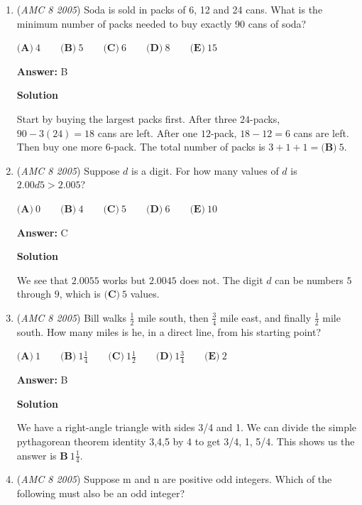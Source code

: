 \begin{enumerate}
	\item (\textit{AMC 8 2005}) Soda is sold in packs of 6, 12 and 24 cans. What is the minimum number of packs needed to buy exactly 90 cans of soda?


 $\textbf{(A)}\ 4\qquad\textbf{(B)}\ 5\qquad\textbf{(C)}\ 6\qquad\textbf{(D)}\ 8\qquad\textbf{(E)}\ 15$

 \textbf{Answer: }B



\textbf{Solution}

Start by buying the largest packs first. After three $24$-packs, $90-3(24)=18$ cans are left. After one $12$-pack, $18-12=6$ cans are left. Then buy one more $6$-pack. The total number of packs is $3+1+1=\boxed{\textbf{(B)}\ 5}$.

 


	\item (\textit{AMC 8 2005}) Suppose $d$ is a digit. For how many values of $d$ is $2.00d5 > 2.005$?


 $\textbf{(A)}\ 0\qquad\textbf{(B)}\ 4\qquad\textbf{(C)}\ 5\qquad\textbf{(D)}\ 6\qquad\textbf{(E)}\ 10$

 \textbf{Answer: }C



\textbf{Solution}

We see that $2.0055$ works but $2.0045$ does not. The digit $d$ can be numbers $5$ through $9$, which is $\boxed{\textbf{(C)}\ 5}$ values.

 


	\item (\textit{AMC 8 2005}) Bill walks $\frac12$ mile south, then $\frac34$ mile east, and finally $\frac12$ mile south. How many miles is he, in a direct line, from his starting point?


 $\textbf{(A)}\ 1\qquad\textbf{(B)}\ 1\frac14\qquad\textbf{(C)}\ 1\frac12\qquad\textbf{(D)}\ 1\frac34\qquad\textbf{(E)}\ 2$

 \textbf{Answer: }B



\textbf{Solution}

We have a right-angle triangle with sides 3/4 and 1. We can divide the simple pythagorean theorem identity 3,4,5 by 4 to get 3/4, 1, 5/4. This shows us the answer is $\boxed{\textbf{B}\ 1\frac{1}{4}}$.

 


	\item (\textit{AMC 8 2005}) Suppose m and n are positive odd integers. Which of the following must also be an odd integer?



\end{enumerate}
